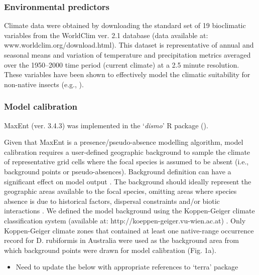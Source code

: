 \documentclass[
  authoryear,
  preprint,
  3p,
  onecolumn]{elsarticle}
\providecommand{\tightlist}{%
  \setlength{\itemsep}{0pt}\setlength{\parskip}{0pt}}\usepackage{longtable,booktabs,array}
\begin{document}
\hypertarget{environmental-predictors}{%
\subsubsection{Environmental
predictors}\label{environmental-predictors}}

Climate data were obtained by downloading the standard set of 19
bioclimatic variables from the WorldClim ver. 2.1 database
\citep{Fick2017} (data available at: www.worldclim.org/download.html).
This dataset is representative of annual and seasonal means and
variation of temperature and precipitation metrics averaged over the
1950--2000 time period (current climate) at a 2.5 minute resolution.
These variables have been shown to effectively model the climatic
suitability for non-native insects (e.g., \citet{Sutton2022}).

\hypertarget{model-calibration}{%
\subsubsection{Model calibration}\label{model-calibration}}

MaxEnt (ver. 3.4.3) was implemented in the `\emph{dismo}' R package
(\citet{Hijmans2017}).

Given that MaxEnt is a presence/pseudo-absence modelling algorithm,
model calibration requires a user-defined geographic background to
sample the climate of representative grid cells where the focal species
is assumed to be absent (i.e., background points or pseudo-absences).
Background definition can have a significant effect on model output
\citep{VanDerWal2009}. The background should ideally represent the
geographic areas available to the focal species, omitting areas where
species absence is due to historical factors, dispersal constraints
and/or biotic interactions \citep{Sanin2018}. We defined the model
background using the Koppen-Geiger climate classification system
(available at: http://koeppen-geiger.vu-wien.ac.at) \citep{Webber2011}.
Only Koppen-Geiger climate zones that contained at least one
native-range occurrence record for D. rubiformis in Australia were used
as the background area from which background points were drawn for model
calibration (Fig. 1a).

\begin{itemize}
\tightlist
\item
  Need to update the below with appropriate references to `terra'
  package
\end{itemize}
\end{document}
